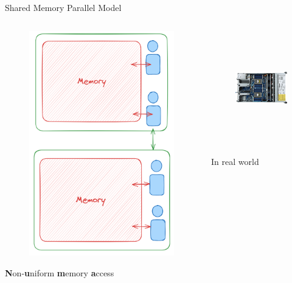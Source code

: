 \begin{frame}{Shared Memory Parallel Model}
\begin{columns}
\begin{column}{0.35\textwidth}
\begin{figure}
        \includegraphics[height=0.5\textheight]{day8_am/img/NUMA.png}
      \end{figure}
      \centering \textbf{N}on-\textbf{u}niform \textbf{m}emory \textbf{a}ccess
    \end{column}
    \begin{column}{0.3\textwidth}
      \begin{figure}
        \centering
        \includegraphics[height=140pt]{day8_am/img/two-way.png}
      \end{figure}
      \centering In real world
    \end{column}
  \end{columns}
\end{frame}

